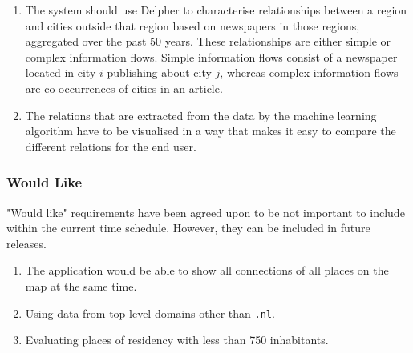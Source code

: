 \begin{enumerate}
    \item The system should use Delpher to characterise relationships between a region and cities outside that region based on newspapers in those regions, aggregated over the past 50 years. These relationships are either simple or complex information flows. Simple information flows consist of a newspaper located in city $i$ publishing about city $j$, whereas complex information flows are co-occurrences of cities in an article.
    \item The relations that are extracted from the data by the machine learning algorithm have to be visualised in a way that makes it easy to compare the different relations for the end user.
\end{enumerate}
\iffalse
\begin{enumerate}
    \item The application could be able to use international names.
    \item A front-end should be build for the UrbanSearch system. This front-end should visualise basic relations and statistics and can be used for presentations or educational purposes
    \item The software should use Delpher to characterise relationships between a region and cities outside that region based on newspapers in those regions, aggregated over the past 50 years. These relationships are either simple or complex information flows. Simple information flows consist of a newspaper located in city i publishing about city j, whereas complex information flows are co-occurrences of cities in an article.
    \item The relations that are extracted from the data by the machine learning algorithm and the relations provided by the CBS have to be visualised in a way that makes it easy to compare the different relations for the end user.
\end{enumerate}
\fi
\subsubsection {Would Like}
"Would like" requirements have been agreed upon to be not important to include within the current time schedule. However, they can be included in future releases.

\begin{enumerate}
    \item The application would be able to show all connections of all places on the map at the same time.
    \item Using data from top-level domains other than \texttt{.nl}.
    \item Evaluating places of residency with less than 750 inhabitants.
\end{enumerate}

